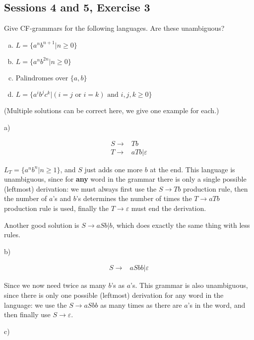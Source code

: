 \subsection{Sessions 4 and 5, Exercise 3}


Give CF-grammars for the following languages. Are these unambiguous?

\begin{enumerate}[(a)]
\item $L = \{a^nb^{n+1}| n\geq{}0\}$
\item $L = \{a^nb^{2n} | n\geq{}0\}$
\item Palindromes over $\{a,b\}$
\item $L = \{a^ib^jc^k | (i = j \text{ or } i = k) \text{ and } i,j,k \geq{} 0\}$
\end{enumerate}


(Multiple solutions can be correct here, we give one example for each.)

a)

\begin{align*}
    S \rightarrow& Tb\\
    T \rightarrow& aTb|\varepsilon
\end{align*}

$L_T = \{a^nb^n | n\geq{}1\}$, and $S$ just adds one more $b$ at the end. This language is unambiguous, since for \textbf{any} word in the grammar there is only a single possible (leftmost) derivation: we must always first use the $S \rightarrow Tb$ production rule, then the number of $a$'s and $b$'s determines the number of times the  $T \rightarrow aTb$ production rule is used, finally the $T \rightarrow \varepsilon$ must end the derivation.

Another good solution is $S \rightarrow aSb | b$, which does exactly the same thing with less rules.

b)

\begin{align*}
    S \rightarrow& aSbb|\varepsilon
\end{align*}

Since we now need twice as many $b$'s as $a$'s. This grammar is also unambiguous, since there is only one possible (leftmost) derivation for any word in the language: we use the $S \rightarrow aSbb$ as many times as there are $a$'s in the word, and then finally use $S \rightarrow \varepsilon$.

c)

